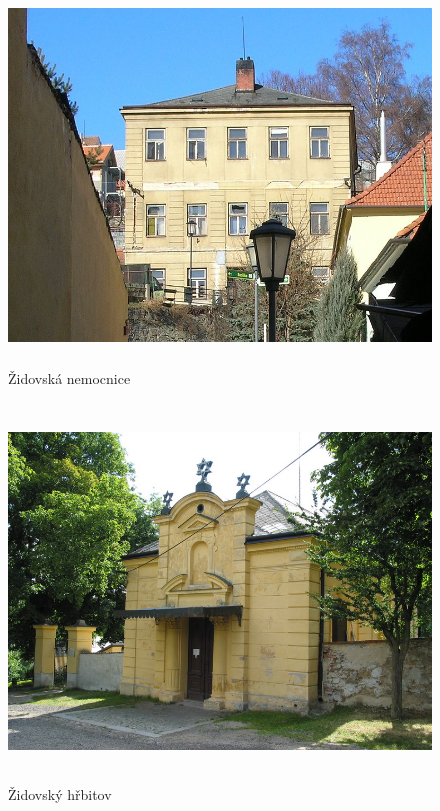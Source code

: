 \documentclass[a4paper,oneside,12pt]{report}
\begin{document}
\begin{figure}[h]
	\centering
	\includegraphics[height=10cm]{../img/zidovskaNemocniceBudova.jpg}
	\caption[Židovská nemocnice \text{[online]} Wikipedia. Dostupné z: \url{https://cs.wikipedia.org/wiki/Soubor:Trebic_zamosti_krankenhaus.jpg} \text{[cit. 2020-03-28]}]{
		Židovská nemocnice
	}
	\label{fig:znb}
\end{figure}

\begin{figure}[h]
	\centering
	\includegraphics[height=10cm]{../img/zidovskyHrbitov.jpg}
	\caption[Židovský hřbitov \text{[online]} Město Třebíč. Dostupné z: \url{http://www.mesto-trebic.cz/zidovsky-hrbitov.php} \text{[cit. 2020-03-28]}]{
		Židovský hřbitov
	}
	\label{fig:zhh}
\end{figure}
\end{document}
